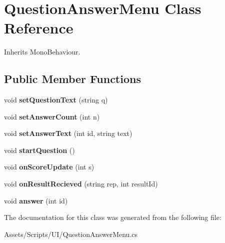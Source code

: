 \hypertarget{class_question_answer_menu}{\section{Question\-Answer\-Menu Class Reference}
\label{class_question_answer_menu}
}


Inherits Mono\-Behaviour.

\subsection*{Public Member Functions}
\begin{DoxyCompactItemize}
\item 
\hypertarget{class_question_answer_menu_af2e832e253ec20722619726ba9ea3e04}{void {\bfseries set\-Question\-Text} (string q)}\label{class_question_answer_menu_af2e832e253ec20722619726ba9ea3e04}

\item 
\hypertarget{class_question_answer_menu_ad948b961d9d792713944c2b7edf4d334}{void {\bfseries set\-Answer\-Count} (int n)}\label{class_question_answer_menu_ad948b961d9d792713944c2b7edf4d334}

\item 
\hypertarget{class_question_answer_menu_a9a82b949854e38ea8d166444618ac8d6}{void {\bfseries set\-Answer\-Text} (int id, string text)}\label{class_question_answer_menu_a9a82b949854e38ea8d166444618ac8d6}

\item 
\hypertarget{class_question_answer_menu_acac55091b9f1f6832d72a5b33bc5ff7d}{void {\bfseries start\-Question} ()}\label{class_question_answer_menu_acac55091b9f1f6832d72a5b33bc5ff7d}

\item 
\hypertarget{class_question_answer_menu_a2f1916aa769baf68573f7442ca0b3ad5}{void {\bfseries on\-Score\-Update} (int s)}\label{class_question_answer_menu_a2f1916aa769baf68573f7442ca0b3ad5}

\item 
\hypertarget{class_question_answer_menu_ab9c2ae0431eef5700dbec2de9a2b05c1}{void {\bfseries on\-Result\-Recieved} (string rep, int result\-Id)}\label{class_question_answer_menu_ab9c2ae0431eef5700dbec2de9a2b05c1}

\item 
\hypertarget{class_question_answer_menu_a7dad58143520fc73d4de1d13b45c9d09}{void {\bfseries answer} (int id)}\label{class_question_answer_menu_a7dad58143520fc73d4de1d13b45c9d09}

\end{DoxyCompactItemize}


The documentation for this class was generated from the following file\-:\begin{DoxyCompactItemize}
\item 
Assets/\-Scripts/\-U\-I/Question\-Answer\-Menu.\-cs\end{DoxyCompactItemize}

